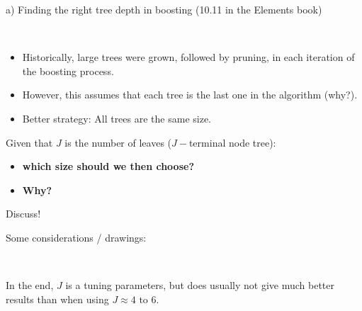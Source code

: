 \documentclass[
  10pt,
  ignorenonframetext,
]{beamer}
\providecommand{\tightlist}{%
  \setlength{\itemsep}{0pt}\setlength{\parskip}{0pt}}
\begin{document}
\begin{frame}
\begin{block}{a) Finding the right tree depth in boosting}
\protect\hypertarget{a-finding-the-right-tree-depth-in-boosting}{}
(10.11 in the Elements book)

\(~\)

\begin{itemize}
\tightlist
\item
  Historically, large trees were grown, followed by pruning, in each
  iteration of the boosting process.
\end{itemize}

\vspace{2mm}

\begin{itemize}
\tightlist
\item
  However, this assumes that each tree is the last one in the algorithm
  (why?).
\end{itemize}

\vspace{2mm}

\begin{itemize}
\tightlist
\item
  Better strategy: All trees are the same size.
\end{itemize}

\pause

\vspace{6mm}

Given that \(J\) is the number of leaves (\(J-\)terminal node tree):

\vspace{2mm}

\begin{itemize}
\tightlist
\item
  \textbf{which size should we then choose?}
\item
  \textbf{Why?}
\end{itemize}

\vspace{2mm}

Discuss!
\end{block}
\end{frame}

\begin{frame}
Some considerations / drawings:

\(~\)

In the end, \(J\) is a tuning parameters, but does usually not give much
better results than when using \(J\approx 4 \text{ to } 6\).

\vspace{50mm}
\end{frame}
\end{document}
